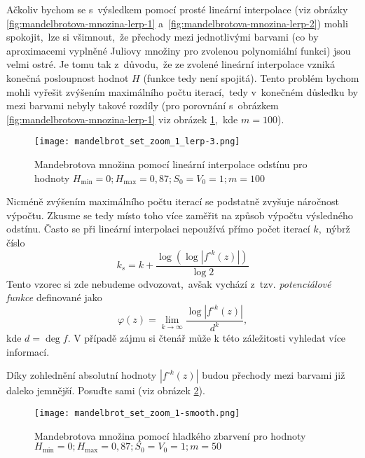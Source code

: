 Ačkoliv bychom se s~výsledkem pomocí prosté lineární interpolace (viz obrázky \ref{fig:mandelbrotova-mnozina-lerp-1} a~\ref{fig:mandelbrotova-mnozina-lerp-2}) mohli spokojit,~lze si všimnout,~že přechody mezi jednotlivými barvami (co by aproximacemi vyplněné Juliovy množiny pro zvolenou polynomiální funkci) jsou velmi ostré. Je tomu tak z~důvodu,~že ze zvolené lineární interpolace vzniká konečná posloupnost hodnot $H$ (funkce tedy není spojitá). Tento problém bychom mohli vyřešit zvýšením maximálního počtu iterací,~tedy v~konečném důsledku by mezi barvami nebyly takové rozdíly (pro porovnání s~obrázkem \ref{fig:mandelbrotova-mnozina-lerp-1} viz obrázek \ref{fig:mandelbrotova-mnozina-lerp-3},~kde $m=100$).
\begin{figure}[h]
    \centering
    \texttt{[image: mandelbrot\_set\_zoom\_1\_lerp-3.png]}
    \caption{Mandebrotova množina pomocí lineární interpolace odstínu pro hodnoty $H_{\text{min}}=0;H_{\text{max}}=0{,}87;S_0=V_0=1;m=100$}
    \label{fig:mandelbrotova-mnozina-lerp-3}
\end{figure}
Nicméně zvýšením maximálního počtu iterací se podstatně zvyšuje náročnost výpočtu. Zkusme se tedy místo toho více zaměřit na způsob výpočtu výsledného odstínu. Často se při lineární interpolaci nepoužívá přímo počet iterací $k$,~nýbrž číslo
\[k_s=k+\dfrac{\log(\log|f^{\circ k}(z)|)}{\log{2}}\]
Tento vzorec si zde nebudeme odvozovat,~avšak vychází z~tzv. \emph{potenciálové funkce} definované jako
\[\varphi(z)=\lim_{k\to \infty }{\frac {\log|f^{\circ k}(z)|}{d^{k}}},\]
kde $d=\deg{f}$. V případě zájmu si čtenář může k této záležitosti vyhledat více informací.

Díky zohlednění absolutní hodnoty $|f^{\circ k}(z)|$ budou přechody mezi barvami již daleko jemnější. Posuďte sami (viz obrázek \ref{fig:mandelbrotova-mnozina-smooth}).
\begin{figure}[h]
    \centering
    \texttt{[image: mandelbrot\_set\_zoom\_1-smooth.png]}
    \caption{Mandebrotova množina pomocí hladkého zbarvení pro hodnoty $H_{\text{min}}=0;H_{\text{max}}=0{,}87;S_0=V_0=1;m=50$}
    \label{fig:mandelbrotova-mnozina-smooth}
\end{figure}
